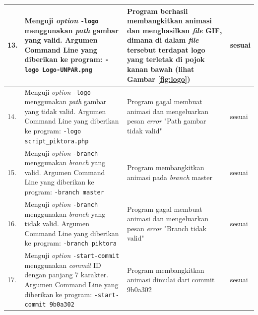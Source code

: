 \begin{table}[htbp]
\begin{tabular}{|p{0.3cm}|>{\raggedright} p{7 cm}| p{5.5 cm}| p{3 cm}|}
		13. & Menguji \textit{option} \texttt{-logo} menggunakan \textit{path} gambar yang valid. Argumen Command Line yang diberikan ke program: \texttt{-logo Logo-UNPAR.png} & Program berhasil membangkitkan animasi dan menghasilkan \textit{file} GIF, dimana di dalam \textit{file} tersebut terdapat logo yang terletak di pojok kanan bawah (lihat Gambar \ref{fig:logo}) & sesuai  \\ \hline
		14. & Menguji \textit{option} \texttt{-logo} menggunakan \textit{path} gambar yang tidak valid. Argumen Command Line yang diberikan ke program: \texttt{-logo script\_piktora.php} & Program gagal membuat animasi dan mengeluarkan pesan \textit{error} "Path gambar tidak valid" & sesuai  \\ \hline
		15. & Menguji \textit{option} \texttt{-branch} menggunakan \textit{branch} yang valid. Argumen Command Line yang diberikan ke program: \texttt{-branch master} & Program membangkitkan animasi pada \textit{branch} master & sesuai  \\ \hline
		16. & Menguji \textit{option} \texttt{-branch} menggunakan \textit{branch} yang tidak valid. Argumen Command Line yang diberikan ke program: \texttt{-branch piktora}  & Program gagal membuat animasi dan mengeluarkan pesan \textit{error} "Branch tidak valid" & sesuai  \\ \hline
		17. & Menguji \textit{option} \texttt{-start-commit} menggunakan \textit{commit} ID dengan panjang 7 karakter. Argumen Command Line yang diberikan ke program:  \texttt{-start-commit 9b0a302} & Program membangkitkan animasi dimulai dari commit 9b0a302 & sesuai  \\ \hline		
		
		
\end{tabular}
	\label{table:hasil_pengujian2}
\end{table}


